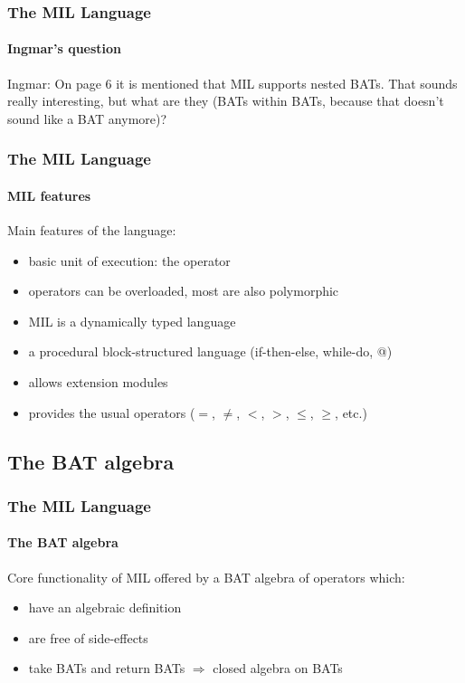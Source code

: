\documentclass{beamer}
\begin{document}
\begin{frame}
  \frametitle{The MIL Language}
  \framesubtitle{Ingmar's question}

  \begin{block}{Ingmar:}
  On page 6 it is mentioned that MIL supports nested BATs. That
  sounds really interesting, but what are they (BATs within BATs,
  because that doesn't sound like a BAT anymore)?
  \end{block}

\end{frame}

\begin{frame}
  \frametitle{The MIL Language}
  \framesubtitle{MIL features}

Main features of the language:
  \begin{itemize}
  \item basic unit of execution: the \alert{operator}
  \pause
  \item operators can be \alert{overloaded}, most are also \alert{polymorphic}
  \pause
  \item MIL is a \alert{dynamically typed} language
  \pause
  \item a \alert{procedural} block-structured language (if-then-else, while-do, @)
  \pause
  \item allows \alert{extension modules}
  \pause
  \item provides the usual operators ($=$, $\neq$, $<$, $>$, $\leq$, $\geq$, etc.)
  \end{itemize}

\end{frame}

\subsection{The BAT algebra}

\begin{frame}
  \frametitle{The MIL Language}
  \framesubtitle{The BAT algebra}

  Core functionality of MIL offered by a \alert{BAT algebra} of operators which:
\begin{itemize}
\item have an algebraic definition
\item are free of side-effects
\item take BATs and return BATs $\Rightarrow$ closed algebra on BATs
\end{itemize}

\end{frame}
\end{document}
